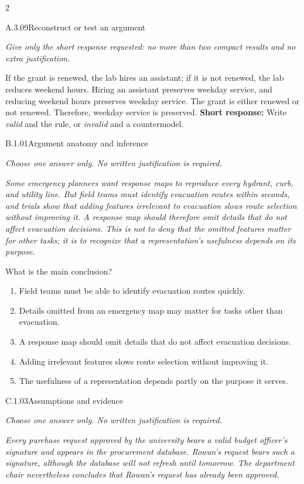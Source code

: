 \documentclass[9pt]{extarticle}
\newcommand{\choice}[1]{\item #1}
\begin{document}
\begin{multicols}{2}
\begin{DenseCoreProblem}{A.3.09}{Reconstruct or test an argument}
{\scriptsize\textit{Give only the short response requested: no more than two compact results and no extra justification.}\par}
If the grant is renewed, the lab hires an assistant; if it is not renewed, the lab reduces weekend hours. Hiring an assistant preserves weekday service, and reducing weekend hours preserves weekday service. The grant is either renewed or not renewed. Therefore, weekday service is preserved.
\textbf{Short response:} Write \emph{valid} and the rule, or \emph{invalid} and a countermodel.
\end{DenseCoreProblem}
\begin{DenseCoreProblem}{B.1.01}{Argument anatomy and inference}
{\scriptsize\textit{Choose one answer only. No written justification is required.}\par}
\emph{Some emergency planners want response maps to reproduce every hydrant, curb, and utility line. But field teams must identify evacuation routes within seconds, and trials show that adding features irrelevant to evacuation slows route selection without improving it. A response map should therefore omit details that do not affect evacuation decisions. This is not to deny that the omitted features matter for other tasks; it is to recognize that a representation's usefulness depends on its purpose.}

What is the main conclusion?
\begin{enumerate}[label=(\alph*)]
  \choice{Field teams must be able to identify evacuation routes quickly.}
  \choice{Details omitted from an emergency map may matter for tasks other than evacuation.}
  \choice{A response map should omit details that do not affect evacuation decisions.}
  \choice{Adding irrelevant features slows route selection without improving it.}
  \choice{The usefulness of a representation depends partly on the purpose it serves.}
\end{enumerate}
\end{DenseCoreProblem}
\columnbreak
\begin{DenseCoreProblem}{C.1.03}{Assumptions and evidence}
{\scriptsize\textit{Choose one answer only. No written justification is required.}\par}
\emph{Every purchase request approved by the university bears a valid budget officer's signature and appears in the procurement database. Rowan's request bears such a signature, although the database will not refresh until tomorrow. The department chair nevertheless concludes that Rowan's request has already been approved.}


\end{DenseCoreProblem}
\end{multicols}
\end{document}
